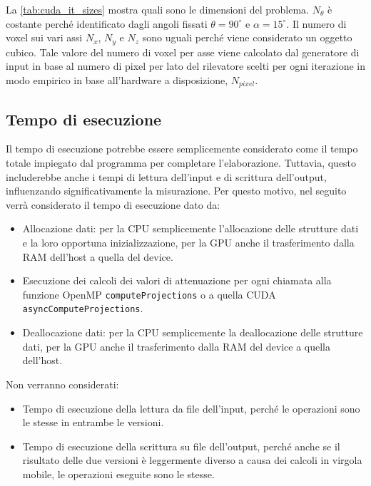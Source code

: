 \documentclass[12pt,a4paper]{report}
\begin{document}
La \autoref{tab:cuda_it_sizes} mostra quali sono le dimensioni del problema.
\(N_\theta\) è costante perché identificato dagli angoli fissati \(\theta = 90^\circ\) e \(\alpha = 15^\circ\).
Il numero di voxel sui vari assi \(N_x\), \(N_y\) e \(N_z\) sono uguali perché viene considerato un oggetto cubico.
Tale valore del numero di voxel per asse viene calcolato dal generatore di input in base al numero di pixel per lato del
rilevatore scelti per ogni iterazione in modo empirico in base all'hardware a disposizione, \(N_{pixel}\).

\subsection{Tempo di esecuzione}

Il tempo di esecuzione potrebbe essere semplicemente considerato come il tempo totale impiegato dal programma per completare
l'elaborazione.
Tuttavia, questo includerebbe anche i tempi di lettura dell'input e di scrittura dell'output, influenzando significativamente la
misurazione.
Per questo motivo, nel seguito verrà considerato il tempo di esecuzione dato da:
\begin{itemize}
  \item Allocazione dati: per la CPU semplicemente l'allocazione delle strutture dati e la loro opportuna inizializzazione, per la
        GPU anche il trasferimento dalla RAM dell'host a quella del device.
  \item Esecuzione dei calcoli dei valori di attenuazione per ogni chiamata alla funzione OpenMP \lstinline{computeProjections} o
        a quella CUDA \mbox{\lstinline{asyncComputeProjections}.}
  \item Deallocazione dati: per la CPU semplicemente la deallocazione delle strutture dati, per la GPU anche il trasferimento
        dalla RAM del device a quella dell'host.
\end{itemize}
Non verranno considerati:
\begin{itemize}
  \item Tempo di esecuzione della lettura da file dell'input, perché le operazioni sono le stesse in entrambe le versioni.
  \item Tempo di esecuzione della scrittura su file dell'output, perché anche se il risultato delle due versioni è leggermente
        diverso a causa dei calcoli in virgola mobile, le operazioni eseguite sono le stesse.
\end{itemize}
\end{document}
